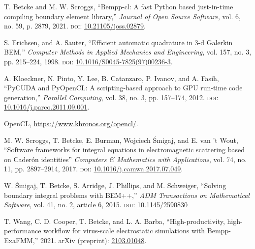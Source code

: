 \documentclass{IEEEcsmag}
\begin{document}

\begin{thebibliography}{1}

T. Betcke and M. W. Scroggs,
``Bempp-cl: A fast Python based just-in-time compiling boundary element library,''
{\it Journal of Open Source Software}, vol. 6, no. 59, p. 2879, 2021.
\textsc{doi}: \href{https://dx.doi.org/10.21105/joss.02879}{10.21105/joss.02879}.

S. Erichsen, and A. Sauter,
``Efficient automatic quadrature in 3-d Galerkin BEM,''
{\it Computer Methods in Applied Mechanics and Engineering}, vol. 157, no. 3, pp. 215--224, 1998.
\textsc{doi}: \href{https://doi.org/10.1016/S0045-7825(97)00236-3}{10.1016/S0045-7825(97)00236-3}.

A. Kloeckner, N. Pinto, Y. Lee, B. Catanzaro, P. Ivanov, and A. Fasih,
``PyCUDA and PyOpenCL: A scripting-based approach to GPU run-time code generation,''
{\it Parallel Computing}, vol. 38, no. 3, pp. 157--174, 2012.
\textsc{doi}: \href{https://dx.doi.org/10.1016/j.parco.2011.09.001}{10.1016/j.parco.2011.09.001}.



OpenCL, \url{https://www.khronos.org/opencl/}.


M. W. Scroggs, T. Betcke, E. Burman, Wojciech \'{S}migaj, and E. van 't Wout, ``Software frameworks for integral equations in electromagnetic scattering based on Cader\'{o}n identities''
{\it Computers \& Mathematics with Applications}, vol. 74, no. 11, pp. 2897--2914, 2017.
\textsc{doi}: \href{https://doi.org/10.1016/j.camwa.2017.07.049}{10.1016/j.camwa.2017.07.049}.

W. \'{S}migaj, T. Betcke, S. Arridge, J. Phillips, and M. Schweiger,
``Solving boundary integral problems with BEM++,''
{\it ADM Transactions on Mathematical Software}, vol. 41, no. 2, article 6, 2015.
\textsc{doi}: \href{https://doi.org/10.1145/2590830}{10.1145/2590830}
	
T. Wang, C. D. Cooper, T. Betcke, and L. A. Barba,
``High-productivity, high-performance workflow for virus-scale electrostatic simulations with Bempp-ExaFMM,''
2021.
arXiv (preprint): \href{https://arxiv.org/abs/2103.01048}{2103.01048}.
\end{thebibliography}
\end{document}
